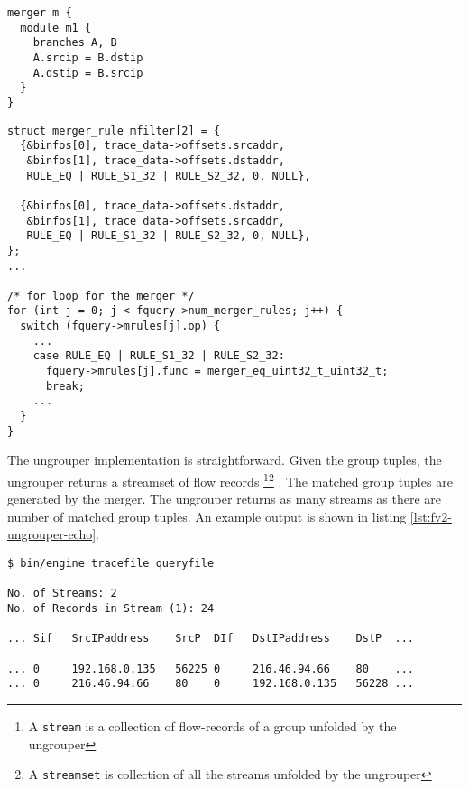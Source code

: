 \begin{lstlisting}
merger m {
  module m1 {
    branches A, B
    A.srcip = B.dstip
    A.dstip = B.srcip
  }
}
\end{lstlisting}

\begin{lstlisting}
struct merger_rule mfilter[2] = {
  {&binfos[0], trace_data->offsets.srcaddr,
   &binfos[1], trace_data->offsets.dstaddr,
   RULE_EQ | RULE_S1_32 | RULE_S2_32, 0, NULL},

  {&binfos[0], trace_data->offsets.dstaddr,
   &binfos[1], trace_data->offsets.srcaddr,
   RULE_EQ | RULE_S1_32 | RULE_S2_32, 0, NULL},
};
...

/* for loop for the merger */
for (int j = 0; j < fquery->num_merger_rules; j++) {
  switch (fquery->mrules[j].op) {
    ...
    case RULE_EQ | RULE_S1_32 | RULE_S2_32:
      fquery->mrules[j].func = merger_eq_uint32_t_uint32_t;
      break;
    ...
  }
}
\end{lstlisting}

The ungrouper implementation is straightforward. Given the group tuples, the
ungrouper  returns a streamset of flow
records \footnote{A \texttt{stream} is a collection of flow-records of a group
unfolded by the ungrouper}\footnote{A \texttt{streamset} is collection of all
the streams unfolded by the ungrouper} . The matched group tuples are
generated by the merger. The ungrouper returns as many streams as there are
number of matched group tuples.  An example output is shown in listing
\ref{lst:fv2-ungrouper-echo}.

\begin{lstlisting}
$ bin/engine tracefile queryfile

No. of Streams: 2
No. of Records in Stream (1): 24

... Sif   SrcIPaddress    SrcP  DIf   DstIPaddress    DstP  ...

... 0     192.168.0.135   56225 0     216.46.94.66    80    ...
... 0     216.46.94.66    80    0     192.168.0.135   56228 ...
\end{lstlisting}



